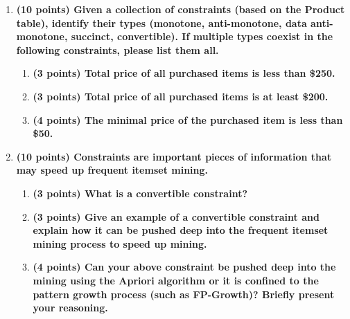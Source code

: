 \documentclass[12pt]{article}
\begin{document}
\begin{enumerate}[label=(\alph*)]
    \item \textbf{(10 points) Given a collection of constraints (based on the Product table), identify their types (monotone, anti-monotone, data anti-monotone, succinct, convertible). If multiple types coexist in the following constraints, please list them all.}
    \begin{enumerate}[label=\roman*.]
        \item \textbf{(3 points) Total price of all purchased items is less than \$250.}
        \\
        
        
        \vspace{1em}
        \item \textbf{(3 points) Total price of all purchased items is at least \$200.}
        \\
        
        
        \vspace{1em}
        \item \textbf{(4 points) The minimal price of the purchased item is less than \$50.}
        \\
        
        
    \end{enumerate}

    \vspace{2em}
    
    \item \textbf{(10 points) Constraints are important pieces of information that may speed up frequent itemset mining.}
    \begin{enumerate}[label=\roman*.]
        \item \textbf{(3 points) What is a convertible constraint?}
        \\
        
        
        \vspace{1em}
        \item \textbf{(3 points) Give an example of a convertible constraint and explain how it can be pushed deep into the frequent itemset mining process to speed up mining.}
        \\
        
        
        \vspace{1em}
        \item \textbf{(4 points) Can your above constraint be pushed deep into the mining using the Apriori algorithm or it is confined to the pattern growth process (such as FP-Growth)? Briefly present your reasoning.}
        \\
        

\end{enumerate}
\end{enumerate}
\end{document}

